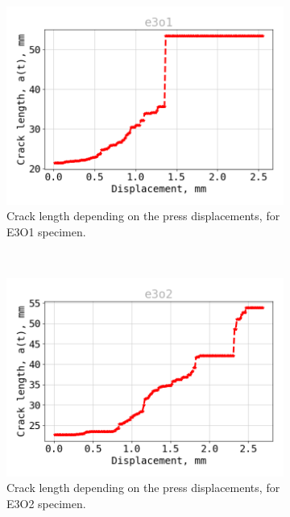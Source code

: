 \begin{figure}[H]
\centering
\begin{subfigure}{0.48\linewidth}
	\centering
	\includegraphics[scale=0.3]{Figures/e3o1_a}
	\decoRule
	\caption[Crack length E3O1]{Crack length depending on the press displacements, for E3O1 specimen.}
	\label{fig:E3O1_a}
\end{subfigure}
\hfill\\
\begin{subfigure}{0.48\linewidth}
	\centering
	\includegraphics[scale=0.3]{Figures/e3o2_a}
	\decoRule
	\caption[Crack length E3O2]{Crack length depending on the press displacements, for E3O2 specimen.}
	\label{fig:E3O2_a}
\end{subfigure}
\hfill\\
\begin{subfigure}{0.48\linewidth}

\end{subfigure}
\end{figure}
